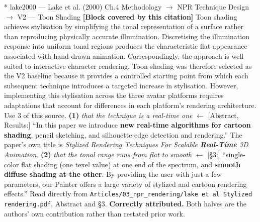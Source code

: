 \documentclass[11pt, a4paper]{article}
\makeatletter
\newcounter{citentry}
\newcommand{\citentry@core}[7]{%
  \stepcounter{citentry}
  \begingroup
  \sbox{\citentry@measurebox}{%
    \begin{minipage}{\linewidth}
      \noindent\colorbox{konstanzblue}{\parbox{\dimexpr\linewidth-2\fboxsep}{%
        \vspace{3pt}
        \textbf{\#\thecitentry \quad #2} \hfill \textit{#3}
        \vspace{3pt}
      }}
      \vspace{3pt}
      \noindent\begin{tabular}{@{}p{2.7cm} p{\dimexpr\linewidth-3cm}@{}}
        \textit{\small Sentence in thesis:} & #4 \\[5pt]
        \textbf{Usage:}\hfill       & #5 \\[5pt]
        \textit{\small Original source:}     & #6 \\[5pt]
        \textbf{How to check:}             & #7 \\
      \end{tabular}
      \vspace{5pt}
      \rule{10pt}{10pt}\quad \textbf{Validated} --- I have read the original and agree it supports the sentence.
    \end{minipage}%
  }%
  \Needspace{\dimexpr\ht\citentry@measurebox+\dp\citentry@measurebox\relax}%
  \endgroup
  \vspace{10pt}
  \noindent\colorbox{konstanzblue}{\parbox{\dimexpr\linewidth-2\fboxsep}{%
    \vspace{3pt}
    \textcolor{white}{\textbf{\#\thecitentry \quad #2}} \hfill \textcolor{white}{\textit{#3}}
    \vspace{3pt}
  }}
  \vspace{3pt}
  \noindent\begin{tabular}{@{}p{2.7cm} p{\dimexpr\linewidth-3cm}@{}}
    \textit{\small Sentence in thesis:} & \textcolor{darkgreen}{#4} \\[5pt]
    \textbf{Usage:}\hfill       & #5 \\[5pt]
    \textit{\small Original source:}     & \textcolor{darkred}{#6} \\[5pt]
    \textbf{How to check:}             & #7 \\
  \end{tabular}
  \vspace{5pt}
  \noindent\CheckBox[name=verified\thecitentry, width=10pt, height=10pt, bordercolor={0 0 0}, borderwidth=0.75, backgroundcolor={1 1 1}#1]{}\quad \textbf{Validated} --- I have read the original and agree it supports the sentence.
  \vspace{3pt}
  \noindent\textcolor{midgray}{\rule{\linewidth}{0.4pt}}
}
\newcommand{\citentry}{\@ifstar{\citentry@core{, checked}}{\citentry@core{}}}
\makeatother
\begin{document}
\begin{Form}
\citentry*
  {lake2000 --- Lake et al. (2000)}
  {Ch.4 Methodology $\rightarrow$ NPR Technique Design $\rightarrow$ V2 — Toon Shading}
  {\textbf{[Block covered by this citation]} Toon shading achieves stylisation by simplifying the tonal representation of a surface rather than reproducing physically accurate illumination. Discretising the illumination response into uniform tonal regions produces the characteristic flat appearance associated with hand-drawn animation. Correspondingly, the approach is well suited to interactive character rendering. Toon shading was therefore selected as the V2 baseline because it provides a controlled starting point from which each subsequent technique introduces a targeted increase in stylisation. However, implementing this stylisation across the three avatar platforms requires adaptations that account for differences in each platform's rendering architecture.}
  {Use 3 of this source.}
  {\textbf{(1)} \emph{that the technique is a real-time one} $\leftarrow$ [Abstract, Results:] ``In this paper we introduce \textbf{new real-time algorithms for cartoon shading}, pencil sketching, and silhouette edge detection and rendering.'' The paper's own title is \emph{Stylized Rendering Techniques For Scalable \textbf{Real-Time} 3D Animation}. \quad \textbf{(2)} \emph{that the tonal range runs from flat to smooth} $\leftarrow$ [\S3:] ``single-color flat shading (one texel value) at one end of the spectrum, and \textbf{smooth diffuse shading at the other}. By providing the user with just a few parameters, our Painter offers a large variety of stylized and cartoon rendering effects.''}
  {Read directly from \texttt{\footnotesize Articles/03\_npr\_rendering/lake et al Stylized rendering.pdf}, Abstract and \S3. \textbf{Correctly attributed.} Both halves are the authors' own contribution rather than restated prior work.}


\end{Form}
\end{document}
